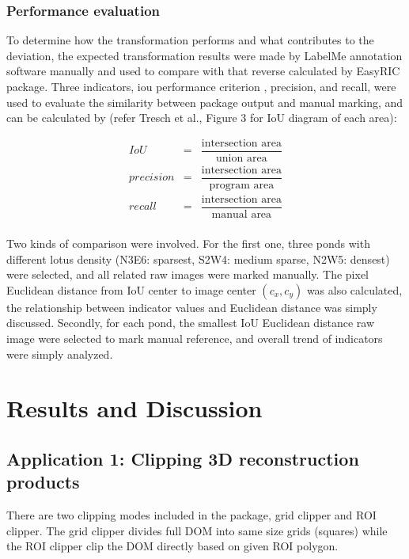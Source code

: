 \documentclass{configs/bmcart}
\begin{document}
\subsubsection*{Performance evaluation}
To determine how the transformation performs and what contributes to the deviation, the expected transformation results were made by LabelMe annotation software manually and used to compare with that reverse calculated by EasyRIC package. Three indicators, \acrfull*{iou} performance criterion \cite{everingham_pascal_2010}, precision, and recall, were used to evaluate the similarity between package output and manual marking, and can be calculated by (refer Tresch et al., \cite{tresch_easympe_2019} Figure 3 for IoU diagram of each area): 

$$
\begin{array}{lcl}
  IoU & = & \dfrac{\text{intersection area}}{\text{union area}} \\
  precision & = & \dfrac{\text{intersection area}}{\text{program area}} \\
  recall & = & \dfrac{\text{intersection area}}{\text{manual area}} \\
\end{array}
$$

Two kinds of comparison were involved. For the first one, three ponds with different lotus density (N3E6: sparsest, S2W4: medium sparse, N2W5: densest) were selected, and all related raw images were marked manually. The pixel Euclidean distance from IoU center to image center $(c_x, c_y)$ was also calculated, the relationship between indicator values and Euclidean distance was simply discussed. Secondly, for each pond, the smallest IoU Euclidean distance raw image were selected to mark manual reference, and overall trend of indicators were simply analyzed.

\section*{Results and Discussion}

\subsection*{Application 1: Clipping 3D reconstruction products}
There are two clipping modes included in the package, grid clipper and ROI clipper. The grid clipper divides full DOM into same size grids (squares) while the ROI clipper clip the DOM directly based on given ROI polygon. 
\end{document}
